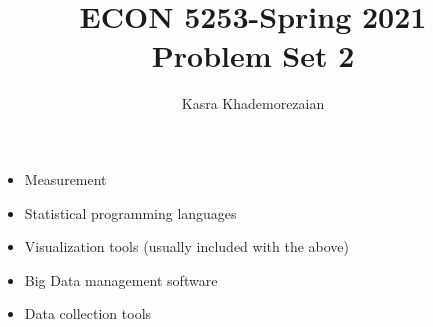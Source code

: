 \documentclass[12pt]{article}
\title{ECON 5253-Spring 2021\\
Problem Set 2}
\author{Kasra Khademorezaian}
\begin{document}
\maketitle
\begin{itemize}
    \item Measurement
    \item Statistical programming languages
    \item Visualization tools (usually included with the above)
    \item Big Data management software
    \item Data collection tools
\end{itemize}
    
\end{document}
